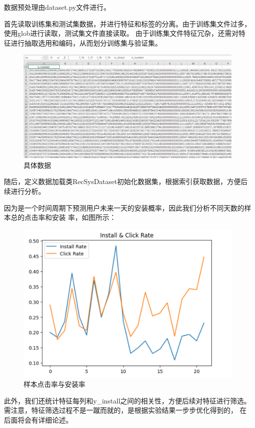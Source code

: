 \documentclass{article}
\begin{document}
数据预处理由dataset.py文件进行。

首先读取训练集和测试集数据，并进行特征和标签的分离。由于训练集文件过多，使用glob进行读取，测试集文件直接读取。
由于训练集文件特征冗杂，还需对特征进行抽取选用和编码，从而划分训练集与验证集。
\begin{figure}[htbp]
  \centering
  \includegraphics[scale=0.3]{rawdata.png}
  \caption{具体数据}
  \label{figure6}
\end{figure}

随后，定义数据加载类RecSysDataset初始化数据集，根据索引获取数据，方便后续进行分析。

因为是一个时间周期下预测用户未来一天的安装概率，因此我们分析不同天数的样本总的点击率和安装
率，如图所示：

\begin{figure}[htbp]
  \centering
  \includegraphics[scale=0.3]{Install.png}
  \caption{样本点击率与安装率}
  \label{figure7}
\end{figure}

此外，我们还统计特征每列和y\_install之间的相关性，方便后续对特征进行筛选。
需注意，特征筛选过程不是一蹴而就的，是根据实验结果一步步优化得到的，
在后面将会有详细论述。
\end{document}
